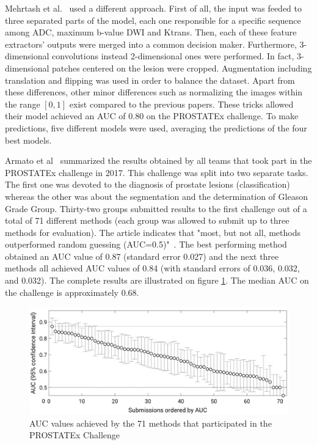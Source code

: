 Mehrtash et al.~\cite{01} used a different approach. First of all, the input was feeded to three separated parts of the model, each one responsible for a specific sequence among ADC, maximum b-value DWI and Ktrans. Then, each of these feature extractors' outputs were merged into a common decision maker. Furthermore, 3-dimensional convolutions instead 2-dimensional ones were performed. In fact, 3-dimensional patches centered on the lesion were cropped. Augmentation including translation and flipping was used in order to balance the dataset. Apart from these differences, other minor differences such as normalizing the images within the range $[0,1]$ exist compared to the previous papers. These tricks allowed their model achieved an AUC of $0.80$ on the PROSTATEx challenge. To make predictions, five different models were used, averaging the predictions of the four best models. 

Armato et al~\cite{42} summarized the results obtained by all teams that took part in the PROSTATEx challenge in 2017. This challenge was split into two separate tasks. The first one was devoted to the diagnosis of prostate lesions (classification) whereas the other was about the segmentation and the determination of Gleason Grade Group. Thirty-two groups submitted results to the first challenge out of a total of 71 different methods (each group was allowed to submit up to three methods for evaluation). The article indicates that "most, but not all, methods outperformed random guessing (AUC=0.5)"~\cite{41}. The best performing method obtained an AUC value of 0.87 (standard error 0.027) and the next three methods all achieved AUC values of 0.84 (with standard errors of 0.036, 0.032, and 0.032). The complete results are illustrated on figure \ref{fig:challenge_all_results}. The median AUC on the challenge is approximately $0.68$.
\begin{figure}[!h]
\centering
\includegraphics[width=1\textwidth, keepaspectratio=true]{./figures/challenge_all_results.png}
\caption{AUC values achieved by the 71 methods that participated in the PROSTATEx Challenge~\cite{42}}
\label{fig:challenge_all_results}
\end{figure}



